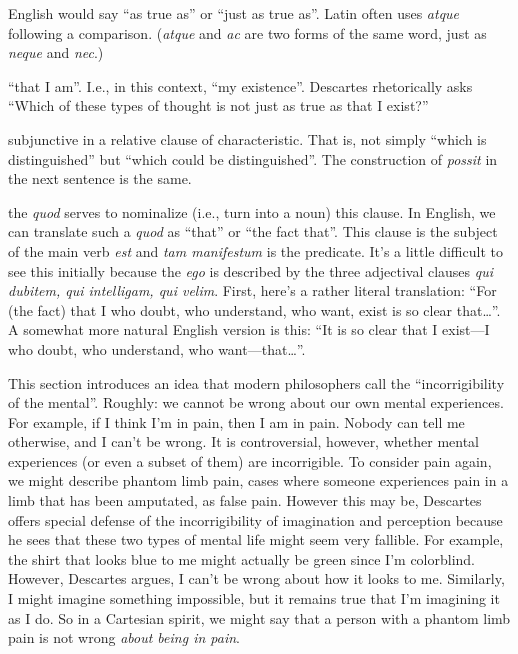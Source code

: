  English would say ``as true as'' or ``just as true as''. Latin often uses \textit{atque} following a comparison. (\textit{atque} and \textit{ac} are two forms of the same word, just as \textit{neque} and \textit{nec}.)

 ``that I am''. I.e., in this context, ``my existence''. Descartes rhetorically asks ``Which of these types of thought is not just as true as that I exist?''

 subjunctive in a relative clause of characteristic. That is, not simply ``which is distinguished'' but ``which could be distinguished''. The construction of \textit{possit} in the next sentence is the same.

 the \textit{quod} serves to nominalize (i.e., turn into a noun) this clause. In English, we can translate such a \textit{quod} as ``that'' or ``the fact that''. This clause is the subject of the main verb \textit{est} and \textit{tam manifestum} is the predicate. It's a little difficult to see this initially because the \textit{ego} is described by the three adjectival clauses \textit{qui dubitem, qui intelligam, qui velim}. First, here's a rather literal translation: ``For (the fact) that I who doubt, who understand, who want, exist is so clear that\dots''. A somewhat more natural English version is this: ``It is so clear that I exist---I who doubt, who understand, who want---that\dots''.

 This section introduces an idea that modern philosophers call the ``incorrigibility of the mental''. Roughly: we cannot be wrong about our own mental experiences. For example, if I think I'm in pain, then I am in pain. Nobody can tell me otherwise, and I can't be wrong. It is controversial, however, whether mental experiences (or even a subset of them) are incorrigible. To consider pain again, we might describe phantom limb pain, cases where someone experiences pain in a limb that has been amputated, as false pain. However this may be, Descartes offers special defense of the incorrigibility of imagination and perception because he sees that these two types of mental life might seem very fallible. For example, the shirt that looks blue to me might actually be green since I'm colorblind. However, Descartes argues, I can't be wrong about how it looks to me. Similarly, I might imagine something impossible, but it remains true that I'm imagining it as I do. So in a Cartesian spirit, we might say that a person with a phantom limb pain is not wrong \textit{about being in pain}.

